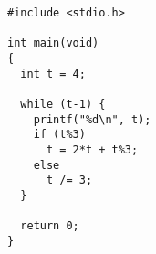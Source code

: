 \begin{verbatim}
#include <stdio.h>

int main(void)
{
  int t = 4;
 
  while (t-1) {
    printf("%d\n", t);
    if (t%3)
      t = 2*t + t%3;
    else
      t /= 3;
  }

  return 0;
}
\end{verbatim}
